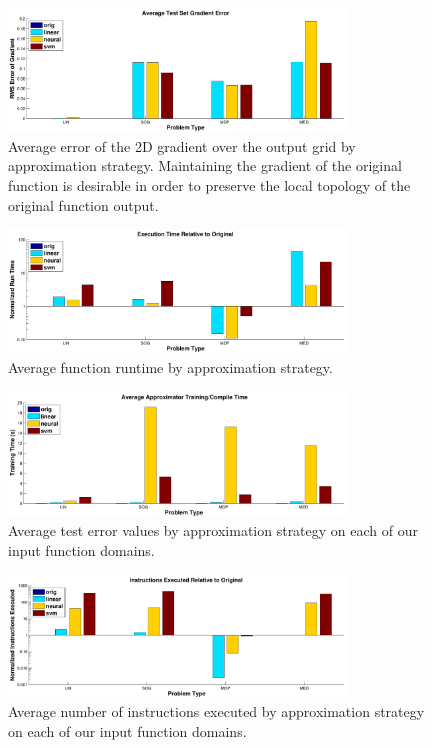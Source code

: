 \documentclass{article}
\begin{document}
\begin{figure}
  \centering
  \includegraphics[width=0.8\textwidth]{images/results_grad_rmse}
  \caption{Average error of the 2D gradient over the output grid by approximation strategy. Maintaining the gradient of the original function is desirable in order to preserve the local topology of the original function output.}
\end{figure}

\begin{figure}
  \centering
  \includegraphics[width=0.8\textwidth]{images/results_run_time}
  \caption{Average function runtime by approximation strategy.}
\end{figure}

\begin{figure}
  \centering
  \includegraphics[width=0.8\textwidth]{images/results_train_time}
  \caption{Average test error values by approximation strategy on each of our input function domains.}
\end{figure}

\begin{figure}
  \centering
  \includegraphics[width=0.8\textwidth]{images/results_instructions}
  \caption{Average number of instructions executed by approximation strategy on each of our input function domains.}
\end{figure}
\end{document}
